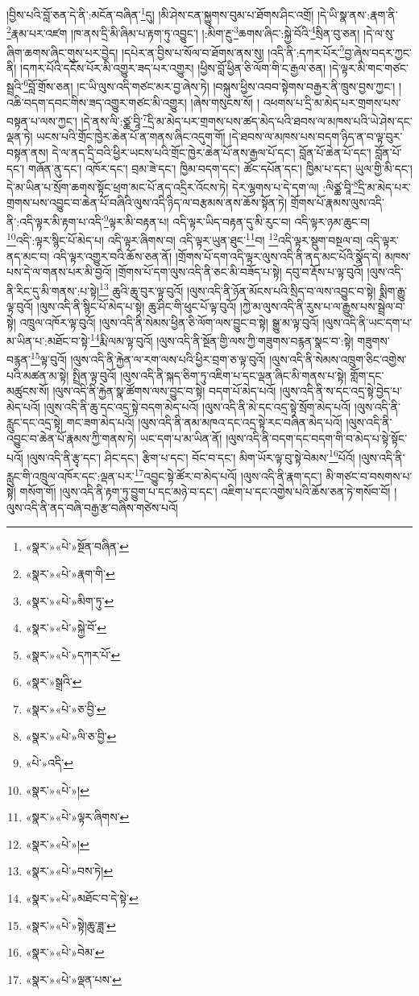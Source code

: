 །བྱིས་པའི་བློ་ཅན་དེ་ནི་:མངོན་བཞིན་\footnote{«སྣར་»«པེ་»སྔོན་བཞིན་}དུ། །མི་ཤེས་ངན་སྐྱུགས་བུམ་པ་ཐོགས་ཤིང་འགྲོ། །དེ་ཡི་སྣ་ནས་:རྣག་ནི་\footnote{«སྣར་»«པེ་»རྣག་གི་}རྣམ་པར་འཛག །ཁ་ནས་དྲི་མི་ཞིམ་པ་རྟག་ཏུ་འབྱུང་། །:མིག་རྔུ་\footnote{«སྣར་»«པེ་»མིག་ཏུ་}ཆགས་ཞིང་:སྐྱེ་བོའི་\footnote{«སྣར་»«པེ་»སྐྱེ་བོ་}སྲིན་བུ་ཅན། །དེ་ལ་སུ་ཞིག་ཆགས་ཞིང་གུས་པར་བྱེད། །དཔེར་ན་བྱིས་པ་སོལ་བ་ཐོགས་ནས་སུ། །འདི་ནི་:དཀར་པོར་\footnote{«སྣར་»«པེ་»དཀར་པོ་}བྱ་ཞེས་བདར་ཀྱང་ནི། །དཀར་པོའི་དངོས་པོར་མི་འགྱུར་ཟད་པར་འགྱུར། །ཕྱིས་བློ་ཕྱིན་ཅི་ལོག་གི་ང་རྒྱལ་ཅན། །དེ་ལྟར་མི་གང་གཙང་སྦྲའི་\footnote{«སྣར་»སྒྲའི་}བློ་གྲོས་ཅན། །ང་ཡི་ལུས་འདི་གཙང་མར་བྱ་ཞེས་ཏེ། །བསྐུས་ཕྱིས་འབབ་སྟེགས་བརྒྱར་ནི་ཁྲུས་བྱས་ཀྱང་། །འཆི་བདག་དབང་གིས་ཟད་འགྱུར་གཙང་མི་འགྱུར། །ཞེས་གསུངས་སོ། །
འཕགས་པ་དྲི་མ་མེད་པར་གྲགས་པས་བསྟན་པ་ལས་ཀྱང་། །དེ་ནས་ལི་:ཙྪ་བཱི་\footnote{«སྣར་»«པེ་»ཅ་བྱི་}དྲི་མ་མེད་པར་གྲགས་པས་ཚད་མེད་པའི་ཐབས་ལ་མཁས་པའི་ཡེ་ཤེས་དང་ལྡན་ཏེ། ཡངས་པའི་གྲོང་ཁྱེར་ཆེན་པོ་ན་གནས་ཞིང་འདུག་གོ། །དེ་ཐབས་ལ་མཁས་པས་བདག་ཉིད་ན་བ་ལྟ་བུར་བསྟན་ནས། དེ་ལ་ནད་དྲི་བའི་ཕྱིར་ཡངས་པའི་གྲོང་ཁྱེར་ཆེན་པོ་ནས་རྒྱལ་པོ་དང་། བློན་པོ་ཆེན་པོ་དང་། བློན་པོ་དང་། གཞོན་ནུ་དང་། འཁོར་དང་། བྲམ་ཟེ་དང་། ཁྱིམ་བདག་དང་། ཚོང་དཔོན་དང་། ཁྱིམ་པ་དང་། ཡུལ་གྱི་མི་དང་། དེ་མ་ཡིན་པ་སྲོག་ཆགས་སྟོང་ཕྲག་མང་པོ་ནད་འདྲིར་འོངས་ཏེ། དེར་ལྷགས་པ་དེ་དག་ལ། :ལིཙྪ་བཱི་\footnote{«སྣར་»«པེ་»ལི་ཅ་བྱི་}དྲི་མ་མེད་པར་གྲགས་པས་འབྱུང་བ་ཆེན་པོ་བཞིའི་ལུས་འདི་ཉིད་ལ་བརྩམས་ནས་ཆོས་སྟོན་ཏེ། གྲོགས་པོ་རྣམས་ལུས་འདི་ནི་:འདི་ལྟར་མི་རྟག་པ་འདི་\footnote{«པེ་»འདི་}ལྟར་མི་བརྟན་པ། འདི་ལྟར་ཡིད་བརྟན་དུ་མི་རུང་བ། འདི་ལྟར་ཉམ་ཆུང་བ། \footnote{«སྣར་»«པེ་»།  }འདི་:ལྟར་སྙིང་པོ་མེད་པ། འདི་ལྟར་ཞིགས་བ། འདི་ལྟར་ཡུན་ཐུང་\footnote{«སྣར་»«པེ་»ལྟར་ཞིགས་}བ། \footnote{«སྣར་»«པེ་»།  }འདི་ལྟར་སྡུག་བསྔལ་བ། འདི་ལྟར་ནད་མང་བ། འདི་ལྟར་འགྱུར་བའི་ཆོས་ཅན་ནོ། །གྲོགས་པོ་དག་འདི་ལྟར་ལུས་འདི་ནི་ནད་མང་པོའི་སྣོད་དེ། མཁས་པས་དེ་ལ་གནས་པར་མི་བྱའོ། །གྲོགས་པོ་དག་ལུས་འདི་ནི་ཅང་མི་བཟོད་པ་སྟེ། དབུ་བ་རྡོས་པ་ལྟ་བུའོ། །ལུས་འདི་ནི་རིང་དུ་མི་གནས་:པ་སྟེ།\footnote{«སྣར་»«པེ་»བས་ཏེ།} ཆུའི་ཆུ་བུར་ལྟ་བུའོ། །ལུས་འདི་ནི་ཉོན་མོངས་པའི་སྲིད་བ་ལས་འབྱུང་བ་སྟེ། སྨིག་རྒྱུ་ལྟ་བུའོ། །ལུས་འདི་ནི་སྙིང་པོ་མེད་པ་སྟེ། ཆུ་ཤིང་གི་ཕུང་པོ་ལྟ་བུའོ། །ཀྱེ་མ་ལུས་འདི་ནི་རུས་པ་ལ་རྒྱུས་པས་སྦྲེལ་བ་སྟེ། འཁྲུལ་འཁོར་ལྟ་བུའོ། །ལུས་འདི་ནི་སེམས་ཕྱིན་ཅི་ལོག་ལས་བྱུང་བ་སྟེ། སྒྱུ་མ་ལྟ་བུའོ། །ལུས་འདི་ནི་ཡང་དག་པ་མ་ཡིན་པ་:མཐོང་བ་སྟེ་\footnote{«སྣར་»«པེ་»མཐོང་བ་དེ་སྟེ་}རྨི་ལམ་ལྟ་བུའོ། །ལུས་འདི་ནི་སྔོན་གྱི་ལས་ཀྱི་གཟུགས་བརྙན་སྣང་བ་:སྟེ། གཟུགས་བརྙན་\footnote{«སྣར་»«པེ་»སྟེ།ཆུ་ཟླ་}ལྟ་བུའོ། །ལུས་འདི་ནི་རྐྱེན་ལ་རག་ལས་པའི་ཕྱིར་བྲག་ཅ་ལྟ་བུའོ། །ལུས་འདི་ནི་སེམས་འཁྲུག་ཅིང་འགྱེས་པའི་མཚན་མ་སྟེ། སྤྲིན་ལྟ་བུའོ། །ལུས་འདི་ནི་སྐད་ཅིག་ཏུ་འཇིག་པ་དང་ལྡན་ཞིང་མི་གནས་པ་སྟེ། གློག་དང་མཚུངས་སོ། །ལུས་འདི་ནི་རྐྱེན་སྣ་ཚོགས་ལས་བྱུང་བ་སྟེ། བདག་པོ་མེད་པའོ། །ལུས་འདི་ནི་ས་དང་འདྲ་སྟེ་བྱེད་པ་མེད་པའོ། །ལུས་འདི་ནི་ཆུ་དང་འདྲ་སྟེ་བདག་མེད་པའོ། །ལུས་འདི་ནི་མེ་དང་འདྲ་སྟེ་སྲོག་མེད་པའོ། །ལུས་འདི་ནི་རླུང་དང་འདྲ་སྟེ། གང་ཟག་མེད་པའོ། །ལུས་འདི་ནི་ནམ་མཁའ་དང་འདྲ་སྟེ་རང་བཞིན་མེད་པའོ། །ལུས་འདི་ནི་འབྱུང་བ་ཆེན་པོ་རྣམས་ཀྱི་གནས་ཏེ། ཡང་དག་པ་མ་ཡིན་ནོ། །ལུས་འདི་ནི་བདག་དང་བདག་གི་བ་མེད་པ་སྟེ་སྟོང་པའོ། །ལུས་འདི་ནི་རྩྭ་དང་། ཤིང་དང་། རྩིག་པ་དང་། བོང་བ་དང་། མིག་ཡོར་ལྟ་བུ་སྟེ་བེམས་\footnote{«སྣར་»«པེ་»བེམ་}པོའོ། །ལུས་འདི་ནི་རླུང་གི་འཁྲུལ་འཁོར་དང་:ལྡན་པར་\footnote{«སྣར་»«པེ་»ལྡན་པས་}འབྱུང་སྟེ་ཚོར་བ་མེད་པའོ། །ལུས་འདི་ནི་རྣག་དང་། མི་གཙང་བ་བསགས་པ་སྟེ། གསོག་གོ། །ལུས་འདི་ནི་རྟག་ཏུ་བྱུག་པ་དང་མཉེ་བ་དང་། འཇིག་པ་དང་འགྱེས་པའི་ཆོས་ཅན་ཏེ་གསོབ་བོ། །ལུས་འདི་ནི་ནད་བཞི་བརྒྱ་རྩ་བཞིས་གཙེས་པའོ། 